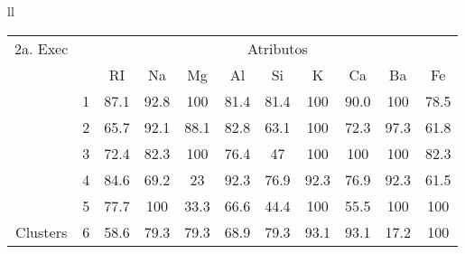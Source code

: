 \begin{table}[!ht]
\begin{tabular}{ll}
   
   \small\addtolength{\tabcolsep}{-5pt}
    \begin{tabular}{|cl|c|c|c|c|c|c|c|c|c|}
        \hline \hline
            {\tiny 2a. Exec}     &   & \multicolumn{9}{c|}{\tiny Atributos}                                               \\ \cline{3-11} 
       \multicolumn{1}{|l}{}                            &   & RI    & Na    & Mg  & Al   & Si   & K   & Ca   & Ba  & Fe             \\ \hline
        \multicolumn{1}{|c|}{}                           & 1 & 87.1 & 92.8  & 100 & 81.4 & 81.4 & 100 & 90.0 & 100 & 78.5 \\ \cline{2-11} 
        \multicolumn{1}{|c|}{}                           & 2 & 65.7 & 92.1  & 88.1& 82.8 & 63.1 & 100  & 72.3 &97.3 & 61.8  \\ \cline{2-11} 
        \multicolumn{1}{|c|}{}                           & 3 & 72.4  & 82.3& 100  & 76.4 & 47 & 100  & 100 & 100 & 82.3  \\ \cline{2-11}
        \multicolumn{1}{|c|}{}                           & 4 & 84.6   & 69.2& 23  & 92.3 & 76.9 & 92.3  & 76.9 & 92.3 & 61.5  \\ \cline{2-11}
        \multicolumn{1}{|c|}{}                           & 5 & 77.7   & 100& 33.3  & 66.6 & 44.4 & 100  & 55.5 & 100 & 100  \\ \cline{2-11}
        \multicolumn{1}{|c|}{\multirow{-3}{*}{\tiny Clusters}} & 6 & 58.6   & 79.3 & 79.3  & 68.9 & 79.3 & 93.1  & 93.1 & 17.2 & 100  \\ 
        
        \hline
      \end{tabular}
  \\  [15ex]
 

\end{tabular}
\end{table}
